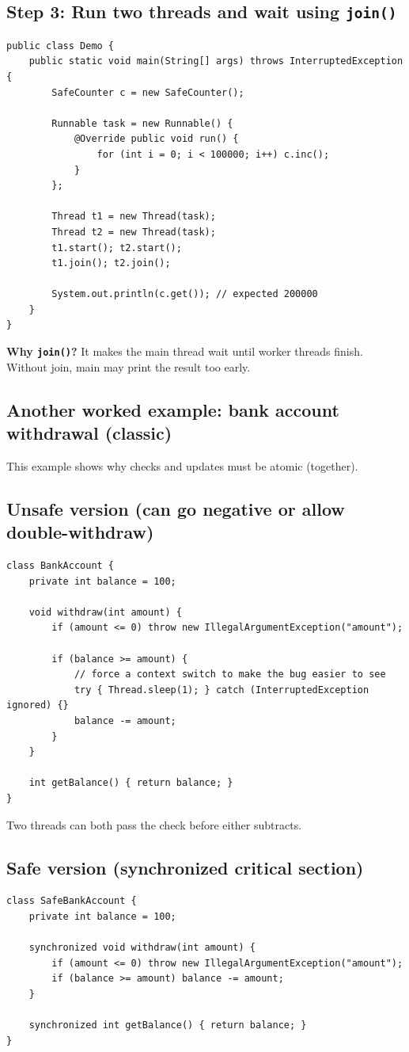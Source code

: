 \documentclass[11pt]{article}
\begin{document}
\subsection*{Step 3: Run two threads and wait using \texttt{join()}}
\begin{lstlisting}
public class Demo {
    public static void main(String[] args) throws InterruptedException {
        SafeCounter c = new SafeCounter();

        Runnable task = new Runnable() {
            @Override public void run() {
                for (int i = 0; i < 100000; i++) c.inc();
            }
        };

        Thread t1 = new Thread(task);
        Thread t2 = new Thread(task);
        t1.start(); t2.start();
        t1.join(); t2.join();

        System.out.println(c.get()); // expected 200000
    }
}
\end{lstlisting}
\textbf{Why \texttt{join()}?} It makes the main thread wait until worker threads finish.
Without join, main may print the result too early.

\subsection{Another worked example: bank account withdrawal (classic)}
This example shows why checks and updates must be atomic (together).

\subsection*{Unsafe version (can go negative or allow double-withdraw)}
\begin{lstlisting}
class BankAccount {
    private int balance = 100;

    void withdraw(int amount) {
        if (amount <= 0) throw new IllegalArgumentException("amount");

        if (balance >= amount) {
            // force a context switch to make the bug easier to see
            try { Thread.sleep(1); } catch (InterruptedException ignored) {}
            balance -= amount;
        }
    }

    int getBalance() { return balance; }
}
\end{lstlisting}
Two threads can both pass the check before either subtracts.

\subsection*{Safe version (synchronized critical section)}
\begin{lstlisting}
class SafeBankAccount {
    private int balance = 100;

    synchronized void withdraw(int amount) {
        if (amount <= 0) throw new IllegalArgumentException("amount");
        if (balance >= amount) balance -= amount;
    }

    synchronized int getBalance() { return balance; }
}
\end{lstlisting}
\end{document}
